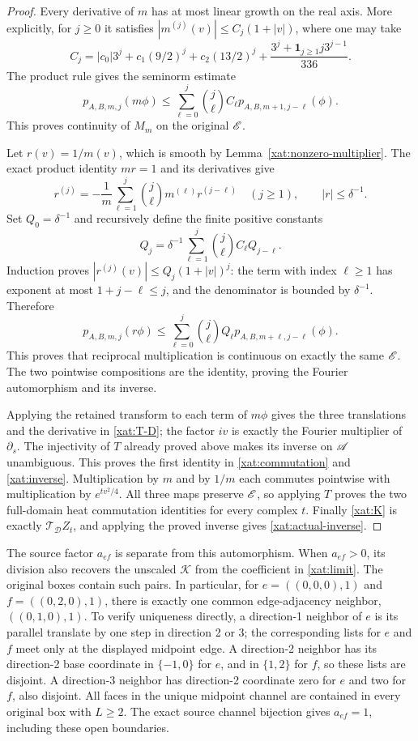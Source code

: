 \begin{proof}
Every derivative of \(m\) has at most linear growth on the real
axis. More explicitly, for \(j\geq0\) it satisfies
\( |m^{(j)}(v)|\leq C_j(1+|v|)\), where one may take
\[
C_j=|c_0|3^j+c_1(9/2)^j+c_2(13/2)^j
       +\frac{3^j+\mathbf1_{j\geq1}j3^{j-1}}{336}.
\]
The product rule gives the seminorm estimate
\[
p_{A,B,m,j}(m\phi)
 \leq\sum_{\ell=0}^j\binom j\ell C_\ell
                     p_{A,B,m+1,j-\ell}(\phi).
\]
This proves continuity of \(M_m\) on the original \(\mathscr E\).

Let \(r(v)=1/m(v)\), which is smooth by
Lemma~\ref{xat:nonzero-multiplier}. The exact product identity
\(mr=1\) and its derivatives give
\[
r^{(j)}=-\frac1m\sum_{\ell=1}^j
                 \binom j\ell m^{(\ell)}r^{(j-\ell)}
\quad(j\geq1),\qquad |r|\leq\delta^{-1}.
\]
Set \(Q_0=\delta^{-1}\) and recursively define the finite
positive constants
\[
Q_j=\delta^{-1}\sum_{\ell=1}^j
                      \binom j\ell C_\ell Q_{j-\ell}.
\]
Induction proves
\(|r^{(j)}(v)|\leq Q_j(1+|v|)^j\): the term with index
\(\ell\geq1\) has exponent at most
\(1+j-\ell\leq j\), and the denominator is bounded by
\(\delta^{-1}\). Therefore
\[
p_{A,B,m,j}(r\phi)
 \leq\sum_{\ell=0}^j\binom j\ell Q_\ell
                         p_{A,B,m+\ell,j-\ell}(\phi).
\]
This proves that reciprocal multiplication is continuous on
exactly the same \(\mathscr E\). The two pointwise compositions are
the identity, proving the Fourier automorphism and its inverse.

Applying the retained transform to each term of \(m\phi\)
gives the three translations and the derivative in
\eqref{xat:T-D}; the factor \(iv\) is exactly the Fourier
multiplier of \(\partial_s\). The injectivity of \(T\) already
proved above makes its inverse on \(\mathscr A\) unambiguous. This
proves the first identity in \eqref{xat:commutation} and
\eqref{xat:inverse}. Multiplication by \(m\) and by \(1/m\)
each commutes pointwise with multiplication by
\(e^{tv^2/4}\). All three maps preserve \(\mathscr E\), so applying
\(T\) proves the two full-domain heat commutation identities
for every complex \(t\). Finally \eqref{xat:K} is exactly
\(\mathcal T_{\mathcal D}Z_t\), and applying the proved inverse
gives \eqref{xat:actual-inverse}.
\end{proof}

The source factor \(a_{ef}\) is separate from this automorphism.
When \(a_{ef}>0\), its division also recovers the unscaled
\(\mathcal K\) from the coefficient in
\eqref{xat:limit}. The original boxes contain such pairs. In
particular, for \(e=((0,0,0),1)\) and
\(f=((0,2,0),1)\), there is exactly one common edge-adjacency
neighbor, \(((0,1,0),1)\). To verify uniqueness directly, a
direction-1 neighbor of \(e\) is its parallel translate by one
step in direction 2 or 3; the corresponding lists for \(e\)
and \(f\) meet only at the displayed midpoint edge. A
direction-2 neighbor has its direction-2 base coordinate in
\(\{-1,0\}\) for \(e\), and in \(\{1,2\}\) for \(f\),
so these lists are disjoint. A direction-3 neighbor has
direction-2 coordinate zero for \(e\) and two for \(f\), also
disjoint. All faces in the unique midpoint channel are contained
in every original box with \(L\geq2\). The exact source
channel bijection gives \(a_{ef}=1\), including these open
boundaries.


